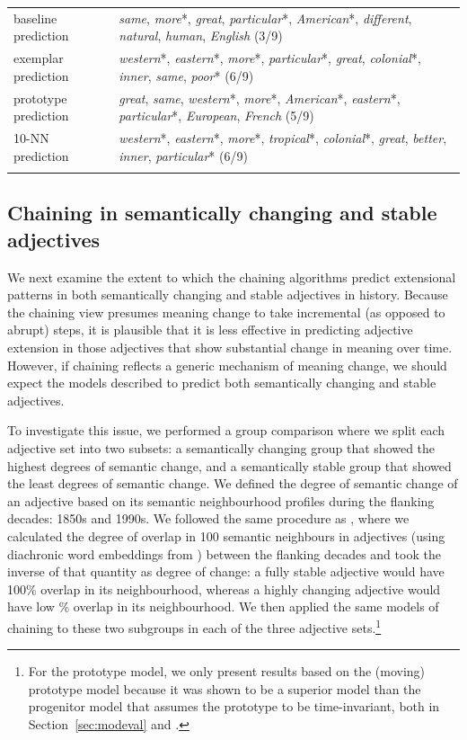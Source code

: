 \documentclass[output=paper]{langsci/langscibook}
\begin{document}
\begin{table}
\begin{tabularx}{\textwidth}{lQ}
baseline prediction & {\it same}, {\it more}*, {\it great}, {\it particular}*, {\it American}*, {\it different}, {\it natural}, {\it human}, {\it English} (3/9) \\
exemplar prediction & {\it western}*, {\it eastern}*, {\it more}*, {\it particular}*, {\it great}, {\it colonial}*, {\it inner}, {\it same}, {\it poor}* (6/9) \\
prototype prediction & {\it great}, {\it same}, {\it western}*, {\it more}*, {\it American}*, {\it eastern}*, {\it particular}*, {\it European}, {\it French} (5/9) \\
10-NN prediction & {\it western}*, {\it eastern}*, {\it more}*, {\it tropical}*, {\it colonial}*, {\it great}, {\it better}, {\it inner}, {\it particular}* (6/9) \\
\lspbottomrule
\end{tabularx}
\end{table}

\subsection{Chaining in semantically changing and stable adjectives}\largerpage

We next examine the extent to which the chaining algorithms predict extensional patterns in both semantically changing and stable adjectives in history. Because the chaining view presumes meaning change to take incremental (as opposed to abrupt) steps, it is plausible that it is less effective in predicting adjective extension in those adjectives that show substantial change in meaning over time. However, if chaining reflects a generic mechanism of meaning change, we should expect the models described to predict both semantically changing and stable adjectives.

To investigate this issue, we performed a group comparison where we split each adjective set into two subsets: a semantically changing group that showed the highest degrees of semantic change, and a semantically stable group that showed the least degrees of semantic change. We defined the degree of semantic change of an adjective based on its semantic neighbourhood profiles during the flanking decades: 1850s and 1990s. We followed the same procedure as \citet{xu2015}, where we calculated the degree of overlap in 100 semantic neighbours in adjectives (using diachronic word embeddings from \citealp{hamilton-etal-2016-diachronic}) between the flanking decades and took the inverse of that quantity as degree of change: a fully stable adjective would have 100\% overlap in its neighbourhood, whereas a highly changing adjective would have low \% overlap in its neighbourhood. We then applied the same models of chaining to these two subgroups in each of the three adjective sets.\footnote{For the prototype model, we only present results based on the (moving) prototype model because it was shown to be a superior model than the progenitor model that assumes the prototype to be time-invariant, both in Section~\ref{sec:modeval} and \citet{habibi}.} 
\end{document}
